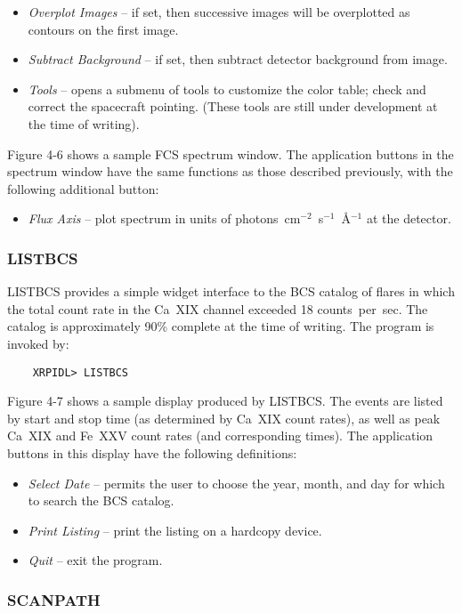 {{{\begin{itemize}
\item{\it Overplot Images} -- if set, then successive images will
be overplotted as contours on the first image.

\item{\it Subtract Background} -- if set, then subtract detector background
from image.

\item{\it Tools} -- opens a submenu of tools to customize the color table;
check and correct the spacecraft pointing. (These tools are still under
development at the time of writing).
\end{itemize}

Figure 4-6 shows a sample FCS spectrum window.
The application
buttons in the spectrum window have the same functions as those described
previously, with the following additional button:

\begin{itemize}
\item{\it Flux Axis} -- plot spectrum in units of
photons~cm$^{-2}$~s$^{-1}$~\AA$^{-1}$ at the detector.
\end{itemize}

\subsubsection{LISTBCS}

LISTBCS provides a simple widget interface to the BCS catalog of flares in
which the total count rate in the Ca~XIX channel exceeded 18 counts~per~sec.
The catalog is approximately 90\% complete at the time of writing.
The program is invoked by:
\begin{verbatim}
    XRPIDL> LISTBCS
\end{verbatim}
Figure 4-7 shows a sample display produced by LISTBCS. The events are
listed by start and stop time (as determined by Ca~XIX count rates), as well as
peak Ca~XIX and Fe~XXV count rates (and corresponding times).
The application buttons in this display have the following definitions:
\begin{itemize}
\item{\it Select Date} -- permits the user to
choose the year, month, and day for which to search the BCS catalog.
\item{\it Print Listing} -- print the listing on a hardcopy device.
\item{\it Quit} -- exit the program.
\end{itemize}

\subsubsection{SCANPATH}

}}}
